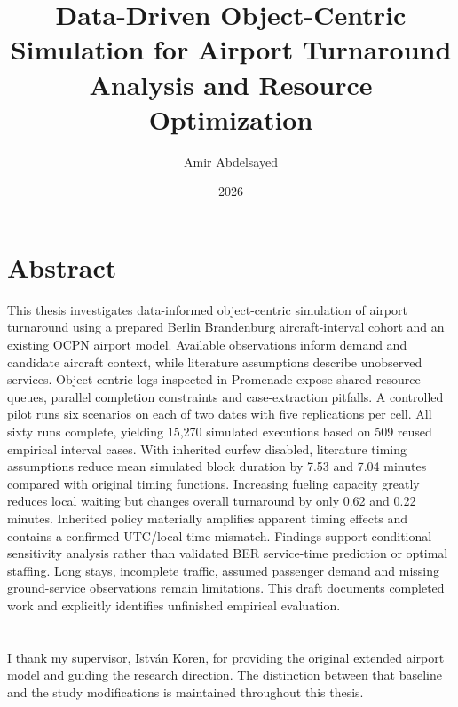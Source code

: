\documentclass[
]{elteikthesis}[2024/04/26]
\title{Data-Driven Object-Centric Simulation for Airport Turnaround Analysis and Resource Optimization} %
\date{2026} %
\author{Amir Abdelsayed}
\affiliation{Head of Department} %
\begin{document}
\maketitle
\chapter*{Abstract}
This thesis investigates data-informed object-centric simulation of airport turnaround using a prepared Berlin Brandenburg aircraft-interval cohort and an existing OCPN airport model. Available observations inform demand and candidate aircraft context, while literature assumptions describe unobserved services. Object-centric logs inspected in Promenade expose shared-resource queues, parallel completion constraints and case-extraction pitfalls. A controlled pilot runs six scenarios on each of two dates with five replications per cell. All sixty runs complete, yielding 15,270 simulated executions based on 509 reused empirical interval cases. With inherited curfew disabled, literature timing assumptions reduce mean simulated block duration by 7.53 and 7.04 minutes compared with original timing functions. Increasing fueling capacity greatly reduces local waiting but changes overall turnaround by only 0.62 and 0.22 minutes. Inherited policy materially amplifies apparent timing effects and contains a confirmed UTC/local-time mismatch. Findings support conditional sensitivity analysis rather than validated BER service-time prediction or optimal staffing. Long stays, incomplete traffic, assumed passenger demand and missing ground-service observations remain limitations. This draft documents completed work and explicitly identifies unfinished empirical evaluation.
\cleardoublepage
\tableofcontents
\cleardoublepage

\cleardoublepage

\cleardoublepage

\cleardoublepage

\cleardoublepage

\cleardoublepage

\cleardoublepage
\chapter*{\acklabel}
I thank my supervisor, Istv\'an Koren, for providing the original extended airport model and guiding the research direction. The distinction between that baseline and the study modifications is maintained throughout this thesis.
\cleardoublepage
\appendix

\cleardoublepage
{}
{}
\printbibliography[title=\biblabel]
\cleardoublepage
\listoffigures
\cleardoublepage
\listoftables
\end{document}

